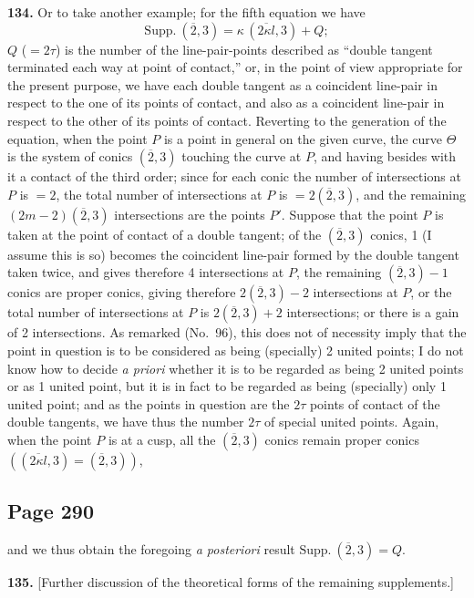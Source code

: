 \documentclass[11pt,a4paper]{article}
\theoremstyle{definition}
\begin{document}
\medskip
\noindent\textbf{134.} Or to take another example; for the fifth equation we have
\[
\text{Supp.}\ (\overline{2},3) = \kappa\,(\overline{2\kappa l}, 3) + Q;
\]
$Q$ ($= 2\tau$) is the number of the line-pair-points described as ``double tangent terminated each way at point of contact,'' or, in the point of view appropriate for the present purpose, we have each double tangent as a coincident line-pair in respect to the one of its points of contact, and also as a coincident line-pair in respect to the other of its points of contact. Reverting to the generation of the equation, when the point $P$ is a point in general on the given curve, the curve $\Theta$ is the system of conics $(\overline{2}, 3)$ touching the curve at $P$, and having besides with it a contact of the third order; since for each conic the number of intersections at $P$ is $= 2$, the total number of intersections at $P$ is $= 2(\overline{2}, 3)$, and the remaining $(2m - 2)(\overline{2}, 3)$ intersections are the points $P'$. Suppose that the point $P$ is taken at the point of contact of a double tangent; of the $(\overline{2}, 3)$ conics, 1 (I assume this is so) becomes the coincident line-pair formed by the double tangent taken twice, and gives therefore 4 intersections at $P$, the remaining $(\overline{2}, 3) - 1$ conics are proper conics, giving therefore $2(\overline{2}, 3) - 2$ intersections at $P$, or the total number of intersections at $P$ is $2(\overline{2}, 3) + 2$ intersections; or there is a gain of 2 intersections. As remarked (No.~96), this does not of necessity imply that the point in question is to be considered as being (specially) 2 united points; I do not know how to decide \textit{a priori} whether it is to be regarded as being 2 united points or as 1 united point, but it is in fact to be regarded as being (specially) only 1 united point; and as the points in question are the $2\tau$ points of contact of the double tangents, we have thus the number $2\tau$ of special united points. Again, when the point $P$ is at a cusp, all the $(\overline{2}, 3)$ conics remain proper conics $((\overline{2\kappa l}, 3) = (\overline{2}, 3))$,

\subsection*{Page 290}

and we thus obtain the foregoing \textit{a posteriori} result $\text{Supp.}\ (\overline{2}, 3) = Q$.

\medskip
\noindent\textbf{135.} [Further discussion of the theoretical forms of the remaining supplements.]
\end{document}
